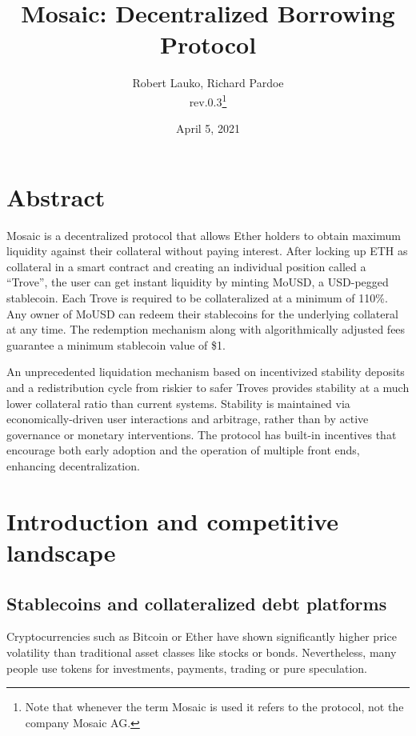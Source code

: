\documentclass{article}
\begin{document}
\title{\textbf{Mosaic: Decentralized Borrowing Protocol}}
\author{Robert Lauko, Richard Pardoe \\ rev.0.3\footnote{Note that whenever the term Mosaic is used it refers to the protocol, not the company Mosaic AG.}}
\date{April 5, 2021}

\maketitle

\section*{Abstract}
Mosaic is a decentralized protocol that allows Ether holders to obtain maximum liquidity against their collateral without paying interest. After locking up ETH as collateral in a smart contract and creating an individual position called a “Trove”, the user can get instant liquidity by minting MoUSD, a USD-pegged stablecoin. Each Trove is required to be collateralized at a minimum of 110\%. Any owner of MoUSD can redeem their stablecoins for the underlying collateral at any time. The redemption mechanism along with algorithmically adjusted fees guarantee a minimum stablecoin value of \$1. 

An unprecedented liquidation mechanism based on incentivized stability deposits and a redistribution cycle from riskier to safer Troves provides stability at a much lower collateral ratio than current systems. Stability is maintained via economically-driven user interactions and arbitrage, rather than by active governance or monetary interventions. 
The protocol has built-in incentives that encourage both early adoption and the operation of multiple front ends, enhancing decentralization.

\newpage

\tableofcontents

\section{Introduction and competitive landscape}

\subsection{Stablecoins and collateralized debt platforms}
Cryptocurrencies such as Bitcoin or Ether have shown significantly higher price volatility than traditional asset classes like stocks or bonds. Nevertheless, many people use tokens for investments, payments, trading or pure speculation.
\end{document}
